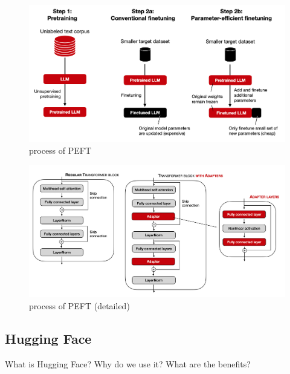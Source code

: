 \documentclass[conference]{IEEEtran}
\begin{document}
\begin{figure}[h!]
    \centering
    \includegraphics[width=.65\linewidth]{pictures/PEFT1.png}
    \caption[PEFT1]{process of PEFT  \cite{Raschka2023}}
    \label{fig:PEFT1}
\end{figure}

\begin{figure}[h!]
    \centering
    \includegraphics[width=.65\linewidth]{pictures/PEFT2.jpg}
    \caption[PEFT2]{process of PEFT (detailed) \cite{Raschka2023}}
    \label{fig:PEFT2}
\end{figure}   




\subsection{Hugging Face}%
What is Hugging Face? Why do we use it? What are the benefits?
\end{document}
